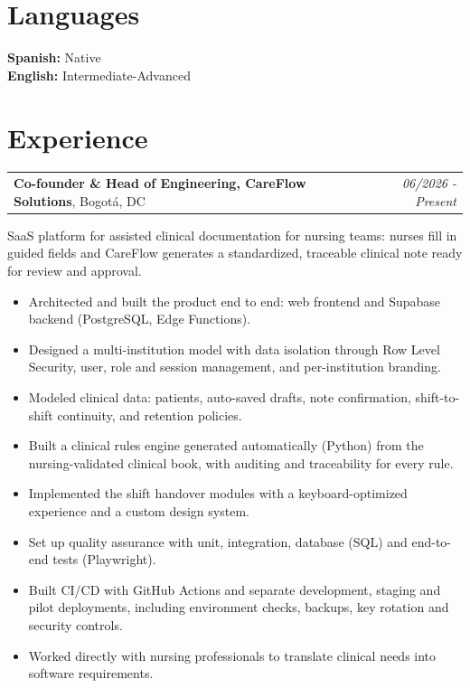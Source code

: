 \documentclass[letterpaper,12pt]{article}
\begin{document}
\section*{\textcolor{primary}{Languages}}
\noindent \textbf{Spanish:} Native\\
\textbf{English:} Intermediate-Advanced

\section*{\textcolor{primary}{Experience}}
\noindent\begin{tabularx}{\textwidth}{Xr}
    \textbf{Co-founder \& Head of Engineering, CareFlow Solutions}, Bogotá, DC & \textit{06/2026 - Present} \\
\end{tabularx}
SaaS platform for assisted clinical documentation for nursing teams: nurses fill in guided fields and CareFlow generates a standardized, traceable clinical note ready for review and approval.
\begin{itemize}
    \item Architected and built the product end to end: web frontend and Supabase backend (PostgreSQL, Edge Functions).
    \item Designed a multi-institution model with data isolation through Row Level Security, user, role and session management, and per-institution branding.
    \item Modeled clinical data: patients, auto-saved drafts, note confirmation, shift-to-shift continuity, and retention policies.
    \item Built a clinical rules engine generated automatically (Python) from the nursing-validated clinical book, with auditing and traceability for every rule.
    \item Implemented the shift handover modules with a keyboard-optimized experience and a custom design system.
    \item Set up quality assurance with unit, integration, database (SQL) and end-to-end tests (Playwright).
    \item Built CI/CD with GitHub Actions and separate development, staging and pilot deployments, including environment checks, backups, key rotation and security controls.
    \item Worked directly with nursing professionals to translate clinical needs into software requirements.
\end{itemize}
\end{document}
